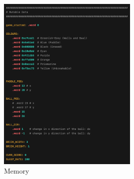\documentclass{article}
\begin{document}
\begin{enumerate}
\begin{figure}[ht!]
    \centering
    \includegraphics[width=0.6\textwidth]{memory.png}
    \caption{Memory}
    \label{Memory}
\end{figure}


\end{enumerate}
\end{document}

